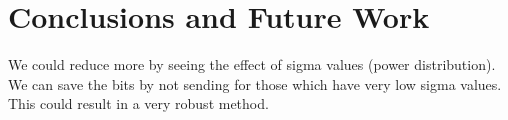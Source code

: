\documentclass[conference]{IEEEtran}
\begin{document}
\section{Conclusions and Future Work} 
\label{section4} 

We could reduce more by seeing the effect of sigma values (power distribution). We can save the bits by not sending for those which have very low sigma values. This could result in a very robust method. 

\vspace{-4pt} 

  








  

  

\renewcommand{\bibfont}{\footnotesize} 

 

 
\end{document}
